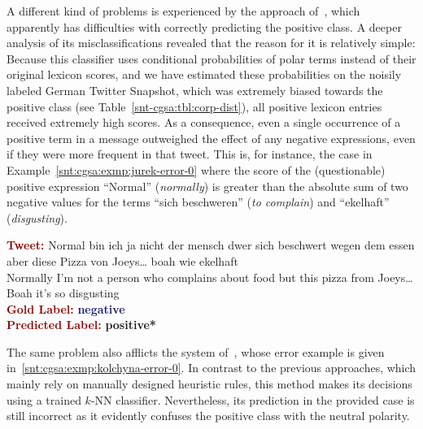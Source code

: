 A different kind of problems is experienced by the approach
of~\citet{Jurek:15}, which apparently has difficulties with correctly
predicting the positive class.  A deeper analysis of its
misclassifications revealed that the reason for it is relatively
simple: Because this classifier uses conditional probabilities of
polar terms instead of their original lexicon scores, and we have
estimated these probabilities on the noisily labeled German Twitter
Snapshot, which was extremely biased towards the positive class (see
Table~\ref{snt-cgsa:tbl:corp-dist}), all positive lexicon entries
received extremely high scores.  As a consequence, even a single
occurrence of a positive term in a message outweighed the effect of
any negative expressions, even if they were more frequent in that
tweet.  This is, for instance, the case in
Example~\ref{snt:cgsa:exmp:jurek-error-0} where the score of the
(questionable) positive expression ``Normal'' (\emph{normally}) is
greater than the absolute sum of two negative values for the terms
``sich beschweren'' (\emph{to complain}) and ``ekelhaft''
(\emph{disgusting}).

\begin{example}\label{snt:cgsa:exmp:jurek-error-0}
  \noindent\textup{\bfseries\textcolor{darkred}{Tweet:}} {\upshape
    Normal bin ich ja nicht der mensch dwer sich beschwert wegen dem
    essen aber diese Pizza von Joeys\ldots{} boah wie ekelhaft}\\
  \noindent Normally I'm not a person who complains about food but
  this pizza from Joeys\ldots{} Boah it's so disgusting\\[0.65em]
  \noindent\textup{\bfseries\textcolor{darkred}{Gold Label:}}\hspace*{4.3em}\textbf{%
    \upshape\textcolor{midnightblue}{negative}}\\
 \noindent\textup{\bfseries\textcolor{darkred}{Predicted Label:}}\hspace*{2em}\textbf{%
    \upshape\textcolor{green3}{positive*}}\\
\end{example}

The same problem also afflicts the system of~\citeauthor{Kolchyna:15},
whose error example is given in~\ref{snt:cgsa:exmp:kolchyna-error-0}.
In contrast to the previous approaches, which mainly rely on manually
designed heuristic rules, this method makes its decisions using a
trained $k$-NN classifier.  Nevertheless, its prediction in the
provided case is still incorrect as it evidently confuses the positive
class with the neutral polarity.

